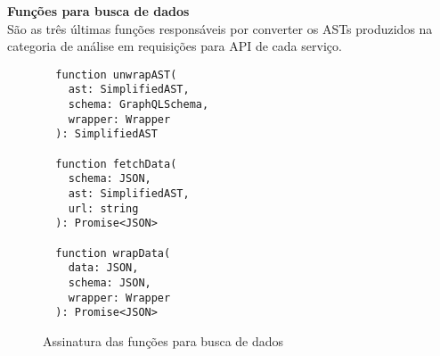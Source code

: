 \textbf{Funções para busca de dados} \\

São as três últimas funções responsáveis por converter os ASTs produzidos na categoria de análise em requisições para API de cada serviço.

\begin{figure}[H]
  \centering
  \begin{verbatim}
  function unwrapAST(
    ast: SimplifiedAST, 
    schema: GraphQLSchema, 
    wrapper: Wrapper
  ): SimplifiedAST

  function fetchData(
    schema: JSON, 
    ast: SimplifiedAST, 
    url: string
  ): Promise<JSON>

  function wrapData(
    data: JSON, 
    schema: JSON, 
    wrapper: Wrapper
  ): Promise<JSON>
  \end{verbatim}
  \caption{Assinatura das funções para busca de dados}
\end{figure}
